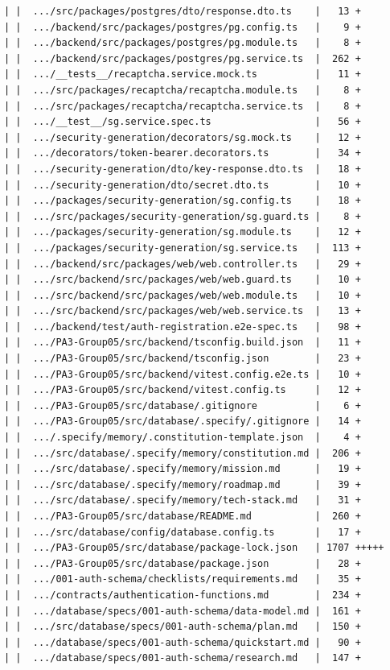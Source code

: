 \documentclass[12pt]{article}
\begin{document}
\begin{lstlisting}[numbers=none,breaklines=true]
| |  .../src/packages/postgres/dto/response.dto.ts    |   13 +
| |  .../backend/src/packages/postgres/pg.config.ts   |    9 +
| |  .../backend/src/packages/postgres/pg.module.ts   |    8 +
| |  .../backend/src/packages/postgres/pg.service.ts  |  262 +
| |  .../__tests__/recaptcha.service.mock.ts          |   11 +
| |  .../src/packages/recaptcha/recaptcha.module.ts   |    8 +
| |  .../src/packages/recaptcha/recaptcha.service.ts  |    8 +
| |  .../__test__/sg.service.spec.ts                  |   56 +
| |  .../security-generation/decorators/sg.mock.ts    |   12 +
| |  .../decorators/token-bearer.decorators.ts        |   34 +
| |  .../security-generation/dto/key-response.dto.ts  |   18 +
| |  .../security-generation/dto/secret.dto.ts        |   10 +
| |  .../packages/security-generation/sg.config.ts    |   18 +
| |  .../src/packages/security-generation/sg.guard.ts |    8 +
| |  .../packages/security-generation/sg.module.ts    |   12 +
| |  .../packages/security-generation/sg.service.ts   |  113 +
| |  .../backend/src/packages/web/web.controller.ts   |   29 +
| |  .../src/backend/src/packages/web/web.guard.ts    |   10 +
| |  .../src/backend/src/packages/web/web.module.ts   |   10 +
| |  .../src/backend/src/packages/web/web.service.ts  |   13 +
| |  .../backend/test/auth-registration.e2e-spec.ts   |   98 +
| |  .../PA3-Group05/src/backend/tsconfig.build.json  |   11 +
| |  .../PA3-Group05/src/backend/tsconfig.json        |   23 +
| |  .../PA3-Group05/src/backend/vitest.config.e2e.ts |   10 +
| |  .../PA3-Group05/src/backend/vitest.config.ts     |   12 +
| |  .../PA3-Group05/src/database/.gitignore          |    6 +
| |  .../PA3-Group05/src/database/.specify/.gitignore |   14 +
| |  .../.specify/memory/.constitution-template.json  |    4 +
| |  .../src/database/.specify/memory/constitution.md |  206 +
| |  .../src/database/.specify/memory/mission.md      |   19 +
| |  .../src/database/.specify/memory/roadmap.md      |   39 +
| |  .../src/database/.specify/memory/tech-stack.md   |   31 +
| |  .../PA3-Group05/src/database/README.md           |  260 +
| |  .../src/database/config/database.config.ts       |   17 +
| |  .../PA3-Group05/src/database/package-lock.json   | 1707 +++++
| |  .../PA3-Group05/src/database/package.json        |   28 +
| |  .../001-auth-schema/checklists/requirements.md   |   35 +
| |  .../contracts/authentication-functions.md        |  234 +
| |  .../database/specs/001-auth-schema/data-model.md |  161 +
| |  .../src/database/specs/001-auth-schema/plan.md   |  150 +
| |  .../database/specs/001-auth-schema/quickstart.md |   90 +
| |  .../database/specs/001-auth-schema/research.md   |  147 +

\end{lstlisting}
\end{document}
